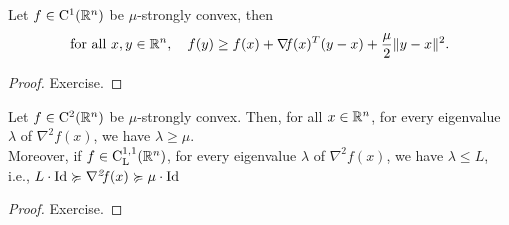 \documentclass[10pt,a4paper]{article}
\begin{document}
\begin{lemma}
	Let $f \in \mathord{\mathrm{C^1}}(\mathbb{R}^n)$ be $\mu$-strongly convex, then
	\begin{equation}\label{eq:variational_sc}
		\text{for all } x, y \in \mathbb{R}^n, \quad f(y) \geq f(x) + \operatorname*{\mathit{\nabla \!f}}(x)^T(y - x) + \frac{\mu}{2}\|y - x\|^2.
	\end{equation}
\end{lemma}

\begin{proof}
	Exercise.
\end{proof} 

\begin{lemma}Let $f\in \mathord{\mathrm{C^2}}(\mathbb{R}^n)$ be $\mu$-strongly convex. Then, for all $x \in \mathbb{R}^n$, for every eigenvalue $\lambda$ of $\nabla^2 f(x)$, we have $\lambda \geq \mu$.\\
	Moreover, if $f\in \mathord{\mathrm{C^{1,1}_{L}}}(\mathbb{R}^n)$, for every eigenvalue $\lambda$ of $\nabla^2 f(x)$, we have $\lambda \leq L$, i.e., $L \cdot \mathord{\mathrm{Id}}\succcurlyeq\operatorname*{\mathit{\nabla^2 \!f}}(x)\succcurlyeq\mu \cdot\mathord{\mathrm{Id}}$
\end{lemma}

\begin{proof}
	Exercise.
\end{proof}

\end{document}
